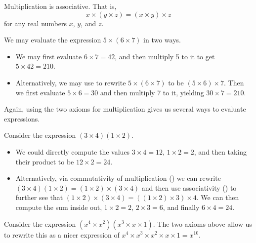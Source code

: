 \begin{axiom}\label{axiom-multiplication-is-associative}
    Multiplication is associative. That is,
    \[
        x\times(y\times z) = (x\times y)\times z
    \]
    for any real numbers $x$, $y$, and $z$.
\end{axiom}
\begin{example}
    We may evaluate the expression $5\times(6\times7)$ in two ways.
    \begin{itemize}
        \item We may first evaluate $6\times7 = 42$, and then multiply 5 to it to get $5 \times 42 = 210$.
        \item Alternatively, we may use  to rewrite $5\times(6\times7)$ to be $(5\times6)\times7$. Then we first evaluate $5\times6 = 30$ and then multiply 7 to it, yielding $30\times7 = 210$.
    \end{itemize}
\end{example}

Again, using the two axioms for multiplication gives us several ways to evaluate expressions.
\begin{example}
    Consider the expression $(3\times4)(1\times2)$.
    \begin{itemize}
        \item We could directly compute the values $3 \times 4 = 12$, $1 \times 2 = 2$, and then taking their product to be $12\times2 = 24$.
        \item Alternatively, via commutativity of multiplication () we can rewrite $(3\times4)(1\times2)=(1\times2)\times(3\times4)$ and then use associativity () to further see that $(1\times2)\times(3\times4) = ((1\times2)\times3)\times4$. We can then compute the sum inside out, $1 \times 2 = 2$, $2 \times 3 = 6$, and finally $6 \times 4 = 24$.
    \end{itemize}
\end{example}
\begin{example}
    Consider the expression $(x^4\times x^2)(x^3 \times x \times 1)$. The two axioms above allow us to rewrite this as a nicer expression of $x^4 \times x^3 \times x^2 \times x \times 1 = x^{10}$.
\end{example}

